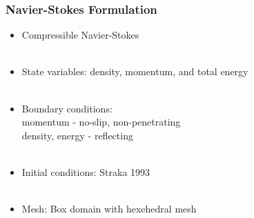 \documentclass{beamer}
\begin{document}
\begin{frame}
\begin{center}
\frametitle{Navier-Stokes Formulation}

\begin{itemize}

\item Compressible Navier-Stokes\\

~\\

\item State variables: density, momentum, and total energy\\

~\\

\item Boundary conditions:\\

\hspace{6mm} momentum - no-slip, non-penetrating\\

\hspace{6mm} density, energy - reflecting\\

~\\

\item Initial conditions: Straka 1993\\

~\\

\item Mesh: Box domain with hexehedral mesh

\end{itemize}

\end{center}
\end{frame}

\end{document}
